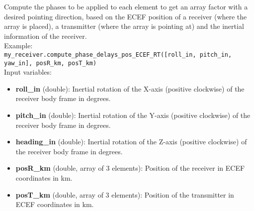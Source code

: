 Compute the phases to be applied to each element to get an array factor with a desired pointing direction, based on the ECEF position of a receiver (where the array is placed), a transmitter (where the array is pointing at) and the inertial information of the receiver.\\

Example:\\

\texttt{my\_receiver.compute\_phase\_delays\_pos\_ECEF\_RT([roll\_in, pitch\_in, yaw\_in], posR\_km, posT\_km)}\\

Input variables:
\begin{itemize}
\item {\bf roll\_in} (double): Inertial rotation of the X-axis (positive clockwise) of the receiver body frame in degrees.
\item {\bf pitch\_in} (double): Inertial rotation of the Y-axis (positive clockwise) of the receiver body frame in degrees.
\item {\bf heading\_in} (double): Inertial rotation of the Z-axis (positive clockwise) of the receiver body frame in degrees.
\item {\bf posR\_km} (double, array of 3 elements): Position of the receiver in ECEF coordinates in km.
\item {\bf posT\_km} (double, array of 3 elements): Position of the transmitter in ECEF coordinates in km.
\end{itemize}
